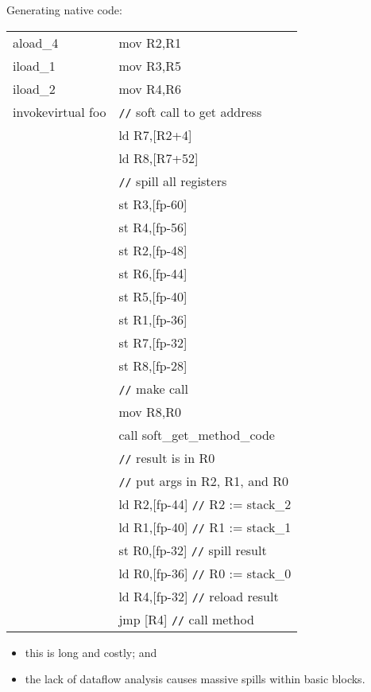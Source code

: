 \begin{slide*}
\renewcommand{\arraystretch}{0.9}
Generating native code:
\begin{center}
\begin{scriptsize}
\begin{tt}
\begin{tabular}{l@{~~~~~~}l}
 aload\_4         &        mov R2,R1\\
 iload\_1         &        mov R3,R5\\
 iload\_2         &        mov R4,R6\\
 invokevirtual foo & \verb"//" soft call to get address \\
               &          ld R7,[R2+4]\\
               &          ld R8,[R7+52]\\
               &          \verb"//" spill all registers \\
               &          st R3,[fp-60]\\
               &          st R4,[fp-56]\\
               &          st R2,[fp-48]\\
               &          st R6,[fp-44]\\
               &          st R5,[fp-40]\\
               &          st R1,[fp-36]\\
               &          st R7,[fp-32]\\
               &          st R8,[fp-28]\\
               &          \verb"//" make call \\
               &          mov R8,R0\\
               &          call soft\_get\_method\_code\\
               &          \verb"//" result is in R0 \\
               &          \verb"//" put args in R2, R1, and R0\\
               &          ld R2,[fp-44]  \verb"//" R2 := stack\_2\\
               &          ld R1,[fp-40]  \verb"//" R1 := stack\_1 \\
               &          st R0,[fp-32]  \verb"//" spill result \\
               &          ld R0,[fp-36]  \verb"//" R0 := stack\_0 \\
               &          ld R4,[fp-32]  \verb"//" reload result \\
               &          jmp [R4]  \verb"//" call method 
\end{tabular}
\end{tt}
\end{scriptsize}
\end{center}
\begin{itemize}
\item this is long and costly; and
\item the lack of dataflow analysis causes massive spills within basic blocks.
\end{itemize}
\renewcommand{\arraystretch}{1}
\vfil
\end{slide*}

